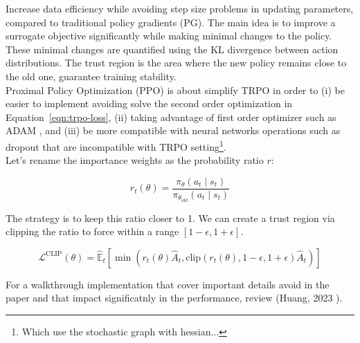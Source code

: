 
\noindent Increase data efficiency while avoiding step size problems in updating parameters, compared to traditional policy gradients (PG). The main idea is to improve a surrogate objective significantly while making minimal changes to the policy. These minimal changes are quantified using the KL divergence between action distributions. The trust region is the area where the new policy remains close to the old one, guarantee training stability. \\


\noindent Proximal Policy Optimization (PPO) \cite{schulman2017proximal} is about simplify TRPO in order to (i) be easier to implement avoiding solve the second order optimization in Equation~\ref{eqn:trpo-loss}, (ii) taking advantage of first order optimizer such as ADAM \cite{kingma2017adammethodstochasticoptimization}, and (iii) be more compatible with neural networks operations such as dropout that are incompatible with TRPO setting\footnote{Which use the stochastic graph with hessian...}. \\

\noindent Let's rename the importance weights as the probability ratio $r$: 

\begin{equation}\label{eqn:importance-ratio-is}
    r_{t}(\theta) = \frac{\pi_{\theta}(a_{t}\mid s_{t})}{\pi_{\theta_{\text{old}}}(a_{t}\mid s_{t})}
\end{equation}

\noindent The strategy is to keep this ratio closer to 1. We can create a trust region via clipping the ratio to force within a range $\left[1-\epsilon, 1+\epsilon \right]$. 

\begin{equation}\label{eqn:clip-ac-objective}
\mathcal{L}^{\text{CLIP}}(\theta) = \hat{\mathbb{E}}_t \left[ \min \left( r_t(\theta) \hat{A}_t, \text{clip}(r_t(\theta), 1 - \epsilon, 1 + \epsilon) \hat{A}_t \right) \right]
\end{equation}

\noindent For a walkthrough implementation that cover important details avoid in the paper and that impact significatnly in the performance, review (Huang, 2023 \cite{dlr191986}).


